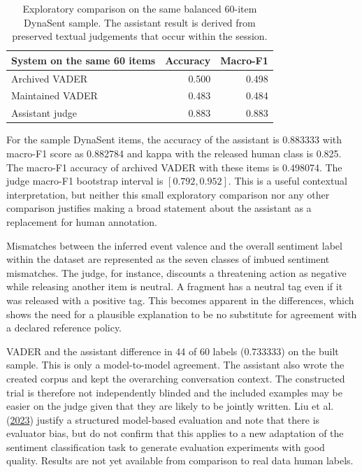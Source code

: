 \documentclass[11pt]{article}
\begin{document}
\begin{table}[t]
\centering\small
\setlength{\tabcolsep}{5pt}
\begin{tabularx}{\columnwidth}{@{}Xrr@{}}
\toprule
System on the same 60 items & Accuracy & Macro-F1\\
\midrule
Archived VADER & 0.500 & 0.498\\
Maintained VADER & 0.483 & 0.484\\
Assistant judge & 0.883 & 0.883\\
\bottomrule
\end{tabularx}
\caption{Exploratory comparison on the same balanced 60-item DynaSent sample. The assistant result is derived from preserved textual judgements that occur within the session.}
\label{tab:user8}
\end{table}

For the sample DynaSent items, the accuracy of the assistant is 0.883333 with macro-F1 score as 0.882784 and kappa with the released human class is 0.825. The macro-F1 accuracy of archived VADER with these items is 0.498074. The judge macro-F1 bootstrap interval is $[0.792,0.952]$. This is a useful contextual interpretation, but neither this small exploratory comparison nor any other comparison justifies making a broad statement about the assistant as a replacement for human annotation.


Mismatches between the inferred event valence and the overall sentiment label within the dataset are represented as the seven classes of imbued sentiment mismatches. The judge, for instance, discounts a threatening action as negative while releasing another item is neutral. A fragment has a neutral tag even if it was released with a positive tag. This becomes apparent in the differences, which shows the need for a plausible explanation to be no substitute for agreement with a declared reference policy.


VADER and the assistant difference in 44 of 60 labels (0.733333) on the built sample. This is only a model-to-model agreement. The assistant also wrote the created corpus and kept the overarching conversation context. The constructed trial is therefore not independently blinded and the included examples may be easier on the judge given that they are likely to be jointly written. Liu et al. (\hyperlink{ref_liu2023geval}{2023}) justify a structured model-based evaluation and note that there is evaluator bias, but do not confirm that this applies to a new adaptation of the sentiment classification task to generate evaluation experiments with good quality. Results are not yet available from comparison to real data human labels.
\end{document}
